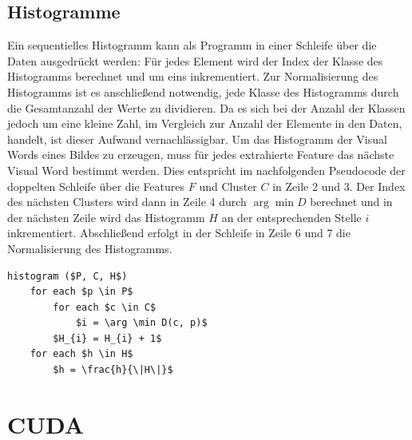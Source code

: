 
\subsection{Histogramme}

Ein sequentielles Histogramm kann als Programm in einer Schleife über die Daten ausgedrückt werden: Für jedes Element wird der Index der Klasse des Histogramms berechnet und um eins inkrementiert. Zur Normalisierung des Histogramms ist es anschließend notwendig, jede Klasse des Histogramms durch die Gesamtanzahl der Werte zu dividieren. Da es sich bei der Anzahl der Klassen jedoch um eine kleine Zahl, im Vergleich zur Anzahl der Elemente in den Daten, handelt, ist dieser Aufwand vernachlässigbar.
Um das Histogramm der Visual Words eines Bildes zu erzeugen, muss für jedes extrahierte Feature das nächste Visual Word bestimmt werden. Dies entspricht im nachfolgenden Pseudocode der doppelten Schleife über die Features $F$ und Cluster $C$ in Zeile 2 und 3. Der Index des nächsten Clusters wird dann in Zeile 4 durch $\arg \min D$ berechnet und in der nächsten Zeile wird das Histogramm $H$ an der entsprechenden Stelle $i$ inkrementiert. Abschließend erfolgt in der Schleife in Zeile 6 und 7 die Normalisierung des Histogramms.

\begin{lstlisting}[mathescape=true]
histogram ($P, C, H$)
	for each $p \in P$
		for each $c \in C$
			$i = \arg \min D(c, p)$ 
		$H_{i} = H_{i} + 1$		
	for each $h \in H$
		$h = \frac{h}{\|H\|}$
\end{lstlisting}

\section{CUDA}

